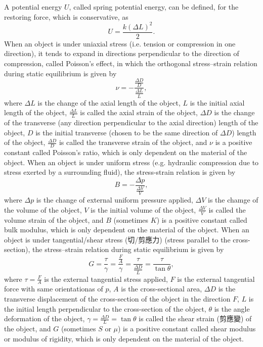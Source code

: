 \documentclass[a4paper,12pt]{article}
\begin{document}
A potential energy $U$, called spring potential energy, can be defined, for the restoring force, which is conservative, as
\[U=\frac{k(\Delta L)^2}{2}.\]
When an object is under uniaxial stress (i.e. tension or compression in one direction), it tends to expand in directions perpendicular to the direction of compression, called Poisson's effect, in which the orthogonal stress–strain relation during static equilibrium is given by
\[\nu=-\frac{\frac{\Delta D}{D}}{\frac{\Delta L}{L}},\]
where $\Delta L$ is the change of the axial length of the object, $L$ is the initial axial length of the object, $\frac{\Delta L}{L}$ is called the axial strain of the object, $\Delta D$ is the change of the transverse (any direction perpendicular to the axial direction) length of the object, $D$ is the initial transverse (chosen to be the same direction of $\Delta D$) length of the object, $\frac{\Delta D}{D}$ is called the transverse strain of the object, and $\nu$ is a positive constant called Poisson's ratio, which is only dependent on the material of the object.
When an object is under uniform stress (e.g. hydraulic compression due to stress exerted by a surrounding fluid), the stress-strain relation is given by
\[B=-\frac{\Delta p}{\frac{\Delta V}{V}},\]
where $\Delta p$ is the change of external uniform pressure applied, $\Delta V$ is the chamge of the volume of the object, $V$ is the initial volume of the object, $\frac{\Delta V}{V}$ is called the volume strain of the object, and $B$ (sometimes $K$) is a positive constant called bulk modulus, which is only dependent on the material of the object.
When an object is under tangential/shear stress (切/剪應力) (stress parallel to the cross-section), the stress–strain relation during static equilibrium is given by
\[G=\frac{\tau}{\gamma}=\frac{\frac{F}{A}}{\gamma}=\frac{\tau}{\frac{\Delta D}{L}}=\frac{\tau}{\tan\theta},\]
where $\tau=\frac{F}{A}$ is the external tangential stress applied, $F$ is the external tangential force with same orientationas of $p$, $A$ is the cross-sectional area, $\Delta D$ is the transverse displacement of the cross-section of the object in the direction $F$, $L$ is the initial length perpendicular to the cross-section of the object, $\theta$ is the angle deformation of the object, $\gamma=\frac{\Delta D}{L}=\tan\theta$ is called the shear strain (剪應變) of the object, and $G$ (sometimes $S$ or $\mu$) is a positive constant called shear modulus or modulus of rigidity, which is only dependent on the material of the object.
\end{document}
